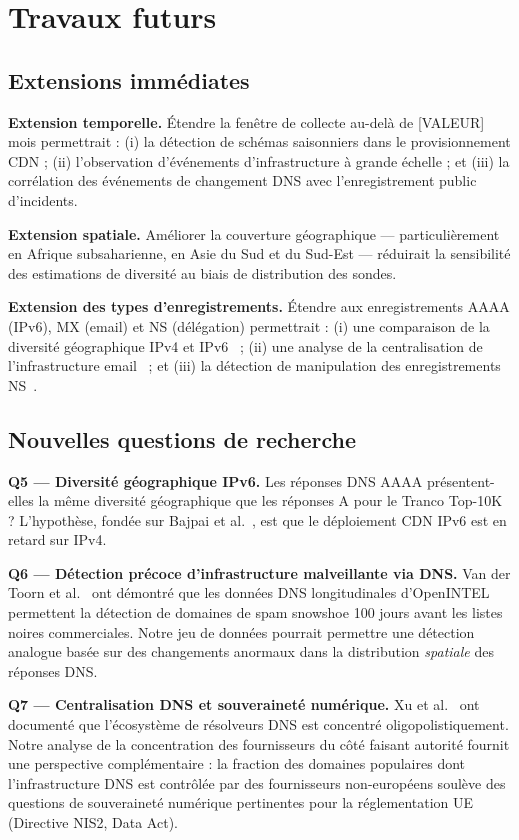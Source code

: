 \section{Travaux futurs}
\label{sec:5.4}

\subsection{Extensions immédiates}
\label{subsec:5.4.1}

\textbf{Extension temporelle.}
Étendre la fenêtre de collecte au-delà de [VALEUR] mois permettrait : (i) la détection de schémas saisonniers dans le provisionnement CDN ; (ii) l'observation d'événements d'infrastructure à grande échelle ; et (iii) la corrélation des événements de changement DNS avec l'enregistrement public d'incidents.

\textbf{Extension spatiale.}
Améliorer la couverture géographique --- particulièrement en Afrique subsaharienne, en Asie du Sud et du Sud-Est --- réduirait la sensibilité des estimations de diversité au biais de distribution des sondes.

\textbf{Extension des types d'enregistrements.}
Étendre aux enregistrements AAAA (IPv6), MX (email) et NS (délégation) permettrait : (i) une comparaison de la diversité géographique IPv4 et IPv6~\cite{Bajpai2017} ; (ii) une analyse de la centralisation de l'infrastructure email~\cite{Xu2023} ; et (iii) la détection de manipulation des enregistrements NS~\cite{Jones2016}.
\bigskip
\subsection{Nouvelles questions de recherche}
\label{subsec:5.4.2}

\textbf{Q5 --- Diversité géographique IPv6.}
Les réponses DNS AAAA présentent-elles la même diversité géographique que les réponses A pour le Tranco Top-10K ? L'hypothèse, fondée sur Bajpai et al.~\cite{Bajpai2017}, est que le déploiement CDN IPv6 est en retard sur IPv4.

\textbf{Q6 --- Détection précoce d'infrastructure malveillante via DNS.}
Van der Toorn et al.~\cite{vanderToorn2018} ont démontré que les données DNS longitudinales d'OpenINTEL permettent la détection de domaines de spam snowshoe 100 jours avant les listes noires commerciales. Notre jeu de données pourrait permettre une détection analogue basée sur des changements anormaux dans la distribution \textit{spatiale} des réponses DNS.

\textbf{Q7 --- Centralisation DNS et souveraineté numérique.}
Xu et al.~\cite{Xu2023} ont documenté que l'écosystème de résolveurs DNS est concentré oligopolistiquement. Notre analyse de la concentration des fournisseurs du côté faisant autorité fournit une perspective complémentaire : la fraction des domaines populaires dont l'infrastructure DNS est contrôlée par des fournisseurs non-européens soulève des questions de souveraineté numérique pertinentes pour la réglementation UE (Directive NIS2, Data Act).
\bigskip
